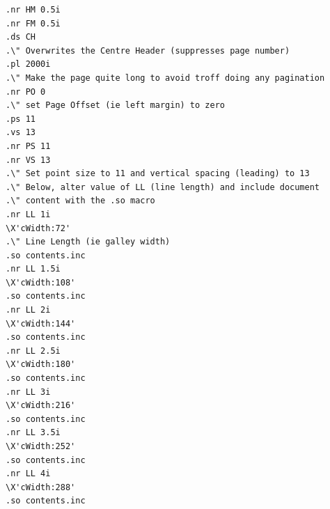 \begin{lstlisting}[label=lst:troffsourcedoc1,captionpos=b,float,basicstyle=\ttfamily\footnotesize,caption={[A sample troff source document, part 1]A sample troff source document. The actual document text is in a file named \texttt{contents.inc} , and is imported multiple times with the \texttt{.so} macro. After each import, the current line length is changed (using, for example, \texttt{.nr LL 1.5i} to set the Line Length register to 1.5 inches). The \texttt{\textbackslash X} commands are used to pass arbitrary data through the typesetter, and into the resultant ditroff intermediate code for later use. In this case, it is used to pass the column width (hence \texttt{cWidth}) in points, so that this data can later be embedded within the final \pdf{} file.}]
.nr HM 0.5i
.nr FM 0.5i
.ds CH 
.\" Overwrites the Centre Header (suppresses page number)
.pl 2000i
.\" Make the page quite long to avoid troff doing any pagination
.nr PO 0
.\" set Page Offset (ie left margin) to zero
.ps 11
.vs 13
.nr PS 11
.nr VS 13
.\" Set point size to 11 and vertical spacing (leading) to 13
.\" Below, alter value of LL (line length) and include document
.\" content with the .so macro
.nr LL 1i
\X'cWidth:72'
.\" Line Length (ie galley width)
.so contents.inc
.nr LL 1.5i
\X'cWidth:108'
.so contents.inc
.nr LL 2i
\X'cWidth:144'
.so contents.inc
.nr LL 2.5i
\X'cWidth:180'
.so contents.inc
.nr LL 3i
\X'cWidth:216'
.so contents.inc
.nr LL 3.5i
\X'cWidth:252'
.so contents.inc
.nr LL 4i
\X'cWidth:288'
.so contents.inc
\end{lstlisting}


